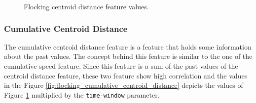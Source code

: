 \documentclass[../../Thesis.tex]{subfiles}
\begin{document}
\begin{figure}
{					}
					\caption{Flocking centroid distance feature values.}
					\label{fig:flocking_centroid_distance}
				\end{figure}
			
			\subsubsection{Cumulative Centroid Distance}
				The cumulative centroid distance feature is a feature that holds some information about the past values. The concept behind this feature is similar to the one of the cumulative speed feature. Since this feature is a sum of the past values of the centroid distance feature, these two feature show high correlation and the values in the Figure \ref{fig:flocking_cumulative_centroid_distance} depicts the values of Figure \ref{fig:flocking_centroid_distance} multiplied by the \verb|time-window| parameter.
\end{document}
